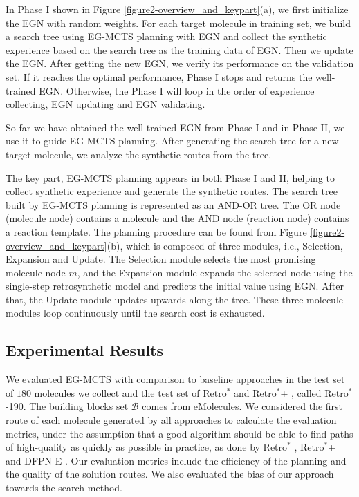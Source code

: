 \documentclass[sn-mathphys,Numbered]{sn-jnl}
\begin{document}
In Phase I shown in Figure \ref{figure2-overview_and_keypart}(a), we first initialize the EGN with random weights. For each target molecule in training set, we build a search tree using EG-MCTS planning with EGN and collect the synthetic experience based on the search tree as the training data of EGN. Then we update the EGN. After getting the new EGN, we verify its performance on the validation set. 
If it reaches the optimal performance, Phase I stops and returns the well-trained EGN. Otherwise, the Phase I will loop in the order of experience collecting, EGN updating and EGN validating.

So far we have obtained the well-trained EGN from Phase I and in Phase II, we use it to guide EG-MCTS planning. After generating the search tree for a new target molecule, we analyze the synthetic routes from the tree.

The key part, EG-MCTS planning appears in both Phase I and II, helping to collect synthetic experience and generate the synthetic routes. The search tree built by EG-MCTS planning is represented as an AND-OR tree. The OR node (molecule node) contains a molecule and the AND node (reaction node) contains a reaction template.
The planning procedure can be found from Figure \ref{figure2-overview_and_keypart}(b), which is composed of three modules, i.e., Selection, Expansion and Update. The Selection module selects the most promising molecule node $m$, and the Expansion module expands the selected node using the single-step retrosynthetic model and predicts the initial value using EGN. After that, the Update module updates upwards along the tree.
These three molecule modules loop continuously until the search cost is exhausted.

\subsection{Experimental Results}\label{emol-exp}
We evaluated EG-MCTS with comparison to baseline approaches in the test set of $180$ molecules we collect and the test set of Retro$^*$ \cite{retro2020} and Retro$^*$+ \cite{2022}, called Retro$^*$-190. The building blocks set $\mathcal{B}$ comes from eMolecules.
We considered the first route of each molecule generated by all approaches to calculate the evaluation metrics, under the assumption that a good algorithm should be able to find paths of high-quality as quickly as possible in practice, as done by Retro$^*$ \citep{retro2020}, Retro$^*$+ \citep{2022} and DFPN-E \citep{DFPN-E2019}. 
Our evaluation metrics include the efficiency of the planning and the quality of the solution routes. We also evaluated the bias of our approach towards the search method.
\end{document}
